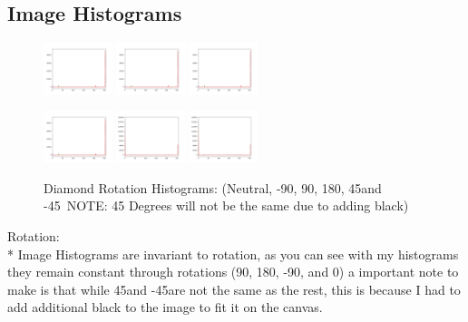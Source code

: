 \documentclass[conference]{IEEEtran}
\begin{document}
\subsection{Image Histograms}
\begin{figure}[htbp]
    \centerline{
        {\includegraphics[width=20mm, scale=0.5]{./figures/RotationHists/diamondneutral Hist.png}}
        {\includegraphics[width=20mm, scale=0.5]{./figures/RotationHists/diamonddeg90 Hist.png}}
        {\includegraphics[width=20mm, scale=0.5]{./figures/RotationHists/diamonddegn90 Hist.png}}
    }
    \centerline{
        {\includegraphics[width=20mm, scale=0.5]{./figures/RotationHists/diamondflipped Hist.png}}
        {\includegraphics[width=20mm, scale=0.5]{./figures/RotationHists/diamonddeg45 Hist.png}}
        {\includegraphics[width=20mm, scale=0.5]{./figures/RotationHists/diamonddegn45 Hist.png}}
    }
    \caption{Diamond Rotation Histograms: (Neutral, -90\degree, 90\degree, 180\degree, 45\degree and -45\degree\ NOTE: 45 Degrees will not be the same due to adding black)}
    \label{fig}
\end{figure}

Rotation: \\*
Image Histograms are invariant to rotation, as you can see with my histograms they remain constant through rotations (90\degree, 180\degree, -90\degree, and 0\degree)
a important note to make is that while 45\degree and -45\degree are not the same as the rest, this is because I had to add additional black to the image to fit it on the canvas.\\
\end{document}
